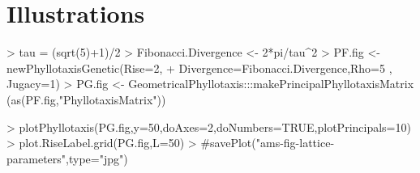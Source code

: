 \documentclass[a4paper]{article}
\begin{document}
\section{Illustrations}

\begin{Schunk}
\begin{Sinput}
> tau = (sqrt(5)+1)/2
> Fibonacci.Divergence <- 2*pi/tau^2
> PF.fig <- newPhyllotaxisGenetic(Rise=2,
+ 	Divergence=Fibonacci.Divergence,Rho=5 , Jugacy=1)
> PG.fig <- GeometricalPhyllotaxis:::makePrincipalPhyllotaxisMatrix (as(PF.fig,"PhyllotaxisMatrix"))
\end{Sinput}
\end{Schunk}
\begin{Schunk}
\begin{Sinput}
> plotPhyllotaxis(PG.fig,y=50,doAxes=2,doNumbers=TRUE,plotPrincipals=10)
> plot.RiseLabel.grid(PG.fig,L=50)
> #savePlot("ams-fig-lattice-parameters",type="jpg")
\end{Sinput}
\end{Schunk}


\end{document}
